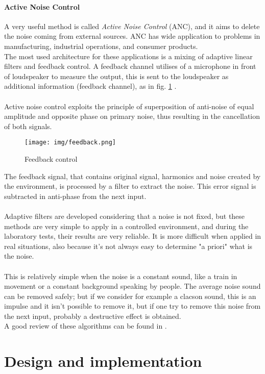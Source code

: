 \subsection{Active Noise Control}
A very useful method is called \textit{Active Noise Control} (ANC), and it aims to delete the noise coming from external sources. ANC has wide application to problems in manufacturing, industrial operations, and consumer products.\\
The most used architecture for these applications is a mixing of adaptive linear filters and feedback control. A feedback channel utilises of a microphone in front of loudspeaker to measure the output, this is sent to the loudspeaker as additional information (feedback channel), as in fig. \ref{fig:feedback} .\\\\
Active noise control exploits the principle of superposition of anti-noise of equal amplitude and opposite phase on primary noise, thus resulting in the cancellation of both signals.
\begin{figure}[h]\centering
\texttt{[image: img/feedback.png]} 
\caption{Feedback control}\label{fig:feedback}
\end{figure}
The feedback signal, that contains original signal, harmonics and noise created by the environment, is processed by a filter to extract the noise. This error signal is subtracted in anti-phase from the next input.\\\\
Adaptive filters are developed considering that a noise is not fixed, but these methods are very simple to apply in a controlled environment, and during the laboratory tests, their results are very reliable. It is more difficult when applied in real situations, also because it's not always easy to determine "a priori" what is the noise.\\\\
This is relatively simple when the noise is a constant sound, like a train in movement or a constant background speaking by people. The average noise sound can be removed safely; but if we consider for example a clacson sound, this is an impulse and it isn't possible to remove it, but if one try to remove this noise from the next input, probably a destructive effect is obtained.\\
A good review of these algorithms can be found in \cite{reviewANC}.
\part{Design and implementation}

